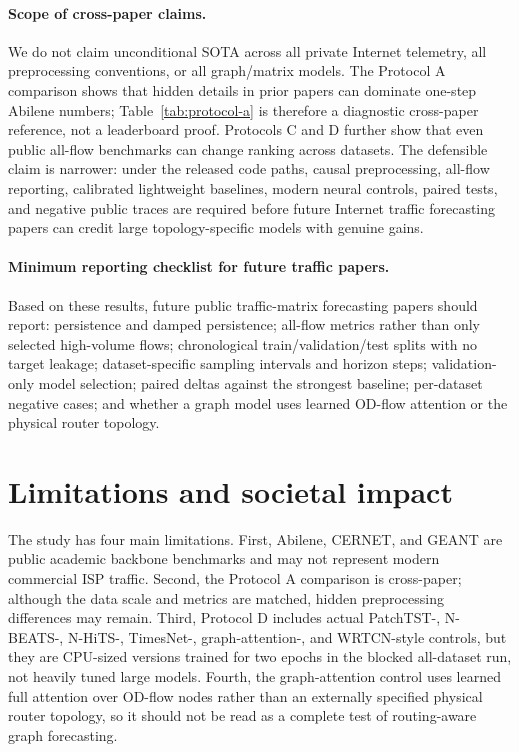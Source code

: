 \documentclass{article}
\begin{document}
\paragraph{Scope of cross-paper claims.}
We do not claim unconditional SOTA across all private Internet telemetry, all preprocessing conventions, or all graph/matrix models. The Protocol A comparison shows that hidden details in prior papers can dominate one-step Abilene numbers; Table~\ref{tab:protocol-a} is therefore a diagnostic cross-paper reference, not a leaderboard proof. Protocols C and D further show that even public all-flow benchmarks can change ranking across datasets. The defensible claim is narrower: under the released code paths, causal preprocessing, all-flow reporting, calibrated lightweight baselines, modern neural controls, paired tests, and negative public traces are required before future Internet traffic forecasting papers can credit large topology-specific models with genuine gains.

\paragraph{Minimum reporting checklist for future traffic papers.}
Based on these results, future public traffic-matrix forecasting papers should report: persistence and damped persistence; all-flow metrics rather than only selected high-volume flows; chronological train/validation/test splits with no target leakage; dataset-specific sampling intervals and horizon steps; validation-only model selection; paired deltas against the strongest baseline; per-dataset negative cases; and whether a graph model uses learned OD-flow attention or the physical router topology.

\section{Limitations and societal impact}

The study has four main limitations. First, Abilene, CERNET, and GEANT are public academic backbone benchmarks and may not represent modern commercial ISP traffic. Second, the Protocol A comparison is cross-paper; although the data scale and metrics are matched, hidden preprocessing differences may remain. Third, Protocol D includes actual PatchTST-, N-BEATS-, N-HiTS-, TimesNet-, graph-attention-, and WRTCN-style controls, but they are CPU-sized versions trained for two epochs in the blocked all-dataset run, not heavily tuned large models. Fourth, the graph-attention control uses learned full attention over OD-flow nodes rather than an externally specified physical router topology, so it should not be read as a complete test of routing-aware graph forecasting.
\end{document}
